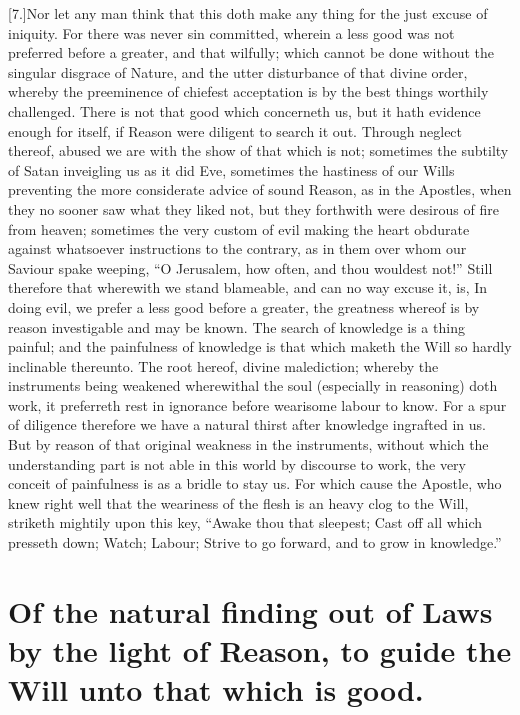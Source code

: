 [7.]Nor let any man think that this doth make any thing for the just excuse of iniquity. For there was never sin committed, wherein a less good was not preferred before a greater, and that wilfully; which cannot be done without the singular disgrace of Nature, and the utter disturbance of that divine order, whereby the preeminence of chiefest acceptation is by the best things worthily challenged. There is not that good which concerneth us, but it hath evidence enough for itself, if Reason were diligent to search it out. Through neglect thereof, abused we are with the show of that which is not; sometimes the subtilty of Satan inveigling us as it did Eve, sometimes the hastiness of our Wills preventing the more considerate advice of sound Reason, as in the Apostles, when they no sooner saw what they liked not, but they forthwith were desirous of fire from heaven; sometimes the very custom of evil making the heart obdurate against whatsoever instructions to the contrary, as in them over whom our Saviour spake weeping, “O Jerusalem, how often, and thou wouldest not!” Still therefore that wherewith we stand blameable, and can no way excuse it, is, In doing evil, we prefer a less good before a greater, the greatness whereof is by reason investigable and may be known. The search of knowledge is a thing painful; and the painfulness of knowledge is that which maketh the Will so hardly inclinable thereunto. The root hereof, divine malediction; whereby the instruments being weakened wherewithal the soul (especially in reasoning) doth work, it preferreth rest in ignorance before wearisome labour to know. For a spur of diligence therefore we have a natural thirst after knowledge ingrafted in us. But by reason of that original weakness in the instruments, without which the understanding part is not  able in this world by discourse to work, the very conceit of painfulness is as a bridle to stay us. For which cause the Apostle, who knew right well that the weariness of the flesh is an heavy clog to the Will, striketh mightily upon this key, “Awake thou that sleepest; Cast off all which presseth down; Watch; Labour; Strive to go forward, and to grow in knowledge.”

\section*{Of the natural finding out of Laws by the light of Reason, to guide the Will unto that which is good.}

